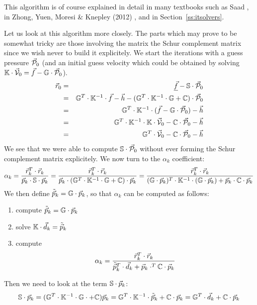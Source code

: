 This algorithm is of course explained in detail in many textbooks such as Saad \cite{saad},
in Zhong, Yuen, Moresi \& Knepley (2012) \cite{zhym12}, and in Section~\ref{ss:itsolvers}.

Let us look at this algorithm more closely. The parts which may prove to be somewhat tricky 
are those involving the matrix the Schur complement matrix since we wish never to build 
it explicitely. We start the iterations with a guess pressure $\vec{\cal P}_0$ (and an initial guess velocity 
which could be obtained by 
solving ${\mathbb{K}}\cdot \vec{\cal V}_0 =\vec{f}- {\mathbb{G}}\cdot \vec{\cal P}_0$).
\begin{eqnarray}
\vec{r}_0 
&=& \underline{\vec{f}}-{\mathbb{S}} \cdot \vec{\cal P}_0 \\
&=& {\mathbb{G}}^T\cdot {\mathbb{K}}^{-1}\cdot \vec{f} - \vec{h} - ({\mathbb{G}}^T\cdot {\mathbb{K}}^{-1}\cdot {\mathbb{G}} + {\mathbb{C}})\cdot \vec{\cal P}_0 \\ 
&=& {\mathbb{G}}^T\cdot {\mathbb{K}}^{-1}\cdot (\vec{f} - {\mathbb{G}}\cdot \vec{\cal P}_0) - \vec{h} \\
&=& {\mathbb{G}}^T\cdot {\mathbb{K}}^{-1}\cdot {\mathbb{K}}\cdot \vec{\cal V}_0 -{\mathbb{C}} \cdot \vec{\cal P}_0 - \vec{h} \\ 
&=& {\mathbb{G}}^T\cdot \vec{\cal V}_0  -{\mathbb{C}} \cdot \vec{\cal P}_0   - \vec{h} 
\end{eqnarray}
We see that we were able to compute ${\mathbb{S}} \cdot \vec{\cal P}_0$ without ever forming the 
Schur complement matrix explicitely. We now turn to the $\alpha_k$ coefficient:
\[
\alpha_k 
= \frac{\vec{r}_k^T\cdot \vec{r}_k }{\vec{p}_k \cdot {\mathbb{S}}\cdot  \vec{p}_k } 
= \frac{\vec{r}_k^T \cdot \vec{r}_k }{\vec{p}_k\cdot ({\mathbb{G}}^T \cdot {\mathbb{K}}^{-1} \cdot {\mathbb{G}} +{\mathbb{C}} )\cdot \vec{p}_k } 
= \frac{\vec{r}_k^T \cdot \vec{r}_k }{({\mathbb{G}}\cdot \vec{p}_k)^T \cdot  {\mathbb{K}}^{-1} \cdot ({\mathbb{G}} \cdot \vec{p}_k) + \vec{p}_k\cdot {\mathbb{C}}\cdot \vec{p}_k } 
\]
We then define $\tilde{\vec{p}}_k = {\mathbb{G}} \cdot \vec{p}_k$, so that $\alpha_k$ can be computed as follows:
\begin{enumerate}
\item compute $\tilde{\vec{p}}_k = {\mathbb{G}} \cdot  \vec{p}_k$
\item solve ${\mathbb{K}}\cdot  \vec{d}_k = \tilde{\vec{p}}_k$
\item compute 
\[
\alpha_k=\frac{\vec{r}_k^T \cdot \vec{r}_k}{\tilde{\vec{p}}_k^T \cdot \vec{d}_k 
+ \vec{p}_k\cdot^T {\mathbb{C}}\cdot \vec{p}_k }
\]
\end{enumerate}
Then we need to look at the term ${\mathbb{S}}\cdot \vec{p}_k$:
\[
{\mathbb{S}}\cdot \vec{p}_k = ({\mathbb{G}}^T\cdot {\mathbb{K}}^{-1}\cdot {\mathbb{G}}\cdot +{\mathbb{C}} )\vec{p}_k 
= {\mathbb{G}}^T\cdot {\mathbb{K}}^{-1}\cdot \tilde{\vec{p}}_k  + {\mathbb{C}}\cdot \vec{p}_k= {\mathbb{G}}^T\cdot  \vec{d}_k + {\mathbb{C}} \cdot \vec{p}_k
\]
